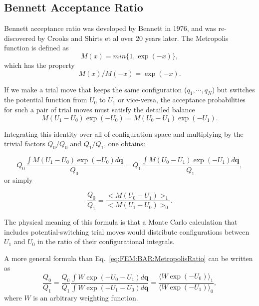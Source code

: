 \subsection{Bennett Acceptance Ratio\label{Sec:FEM:BAR}}
Bennett acceptance ratio was developed by Bennett in 1976,\cite{BennettJComputPhys1976} and was re-discovered by Crooks\cite{CrooksPRE2000} and Shirts et al\cite{ShirtsPRL2003} over 20 years later. The Metropolis function is defined as
\begin{equation}
	M(x)=min\{1,\exp{(-x)}\},
\end{equation}
which has the property 
\begin{equation}
	M(x)/M(-x)=\exp{(-x)}.
\end{equation}

If we make a trial move that keeps the same configuration ($q_{1},\cdots,q_{N}$)
but switches the potential function from $U_{0}$ to $U_{1}$ or vice-versa, 
the acceptance probabilities for such a pair of trial moves must satisfy
the detailed balance
\begin{equation}
	M(U_{1}-U_{0})\exp{(-U_{0})}=M(U_{0}-U_{1})\exp{(-U_{1})}.
\end{equation}

Integrating this identity over all of configuration space and multiplying
by the trivial factors $Q_{0}/Q_{0}$ and $Q_{1}/Q_{1}$, one obtains:

\begin{equation}
	Q_{0}\frac{\int M(U_{1}-U_{0})\exp{(-U_{0})}d\mathbf{{q}}}{Q_{0}}=Q_{1}\frac{\int M(U_{0}-U_{1})\exp{(-U_{1})}d\mathbf{{q}}}{Q_{1}},
\end{equation}
or simply

\begin{equation}
	\frac{Q_{0}}{Q_{1}}=\frac{<M(U_{0}-U_{1})>_{1}}{<M(U_{1}-U_{0})>_{0}}.\label{eq:FEM:BAR:MetropolisRatio}
\end{equation}

The physical meaning of this formula is that a Monte Carlo calculation
that includes potential-switching trial moves would distribute configurations
between $U_{1}$ and $U_{0}$ in the ratio of their configurational
integrals. 

A more general formula than Eq.~\ref{eq:FEM:BAR:MetropolisRatio} can be written
as
\begin{equation}
	\frac{Q_{0}}{Q_{1}}=\frac{Q_{0}}{Q_{1}}\frac{\int W\exp{(-U_{0}-U_{1})}d\mathbf{{q}}}{\int W\exp{(-U_{1}-U_{0})}d\mathbf{{q}}}=\frac{\langle W\exp{(-U_{0})}\rangle_{1}}{\langle W\exp{(-U_{1})}\rangle_{0}},\label{eq:FEM:BAR:weightedratio}
\end{equation}
where $W$ is an arbitrary weighting function.

